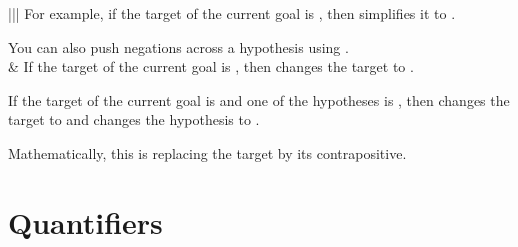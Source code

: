 \documentclass[letterpaper,10pt,english]{sphinxmanual}
\begin{document}
\begin{savenotes}
\begin{tabular}[t]{|||}
\sphinxAtStartPar
For example, if the target of the current goal is , then
 simplifies it to .

\sphinxAtStartPar
You can also push negations across a hypothesis  using .
\\
\hline
\sphinxAtStartPar
{}
&
\sphinxAtStartPar
If the target of the current goal is  ,
then  changes the target to  .

\sphinxAtStartPar
If the target of the current goal is 
and one of the hypotheses is ,
then  changes the target to  
and changes the hypothesis to .

\sphinxAtStartPar
Mathematically, this is replacing the target by its contrapositive.
\\
\hline
\end{tabular}
\par
\sphinxattableend\end{savenotes}


\section{Quantifiers}
\label{\detokenize{tactics:quantifiers}}
\end{document}
